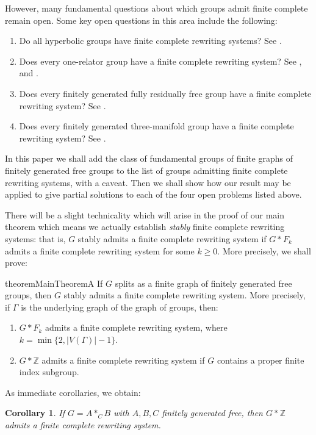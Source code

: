 \documentclass[12pt, a4paper]{amsart}
\newtheorem{corollary}[theorem]{Corollary}
\theoremstyle{definition}
\newcommand{\Z}{\mathbb{Z}}
\begin{document}
However, many fundamental questions about which groups admit finite complete remain open. Some key open questions in this area include the following: 
\begin{enumerate} 
\item
Do all hyperbolic groups have finite complete rewriting systems? See \cite[Problem~2.6]{Diekert2010}.
\item 
Does every one-relator group have a finite complete rewriting system? See \cite{Otto1997}, \cite[Problem 2.9]{Diekert2010} and \cite[Section~1.8.3.]{linton2025theory}.
\item
Does every finitely generated fully residually free group have  a finite complete rewriting system? See 
\cite[Problem~2.7]{Diekert2010}.
\item
Does every finitely generated three-manifold group have a finite complete rewriting system? See \cite{Hermiller1999}.
\end{enumerate}
In this paper we shall add the class of fundamental groups of finite graphs of finitely generated free groups to the list of groups admitting finite complete rewriting systems, with a caveat. Then we shall show how our result may be applied to give partial solutions to each of the four open problems listed above.

There will be a slight technicality which will arise in the proof of our main theorem which means we actually establish \emph{stably} finite complete rewriting systems: that is, $G$ stably admits a finite complete rewriting system if $G*F_k$ admits a finite complete rewriting system for some $k\geqslant 0$. More precisely, we shall prove:


\begin{restatable}{theorem}{MainTheoremA}
\label{thm:main_free}
If $G$ splits as a finite graph of finitely generated free groups, then $G$ stably admits a finite complete rewriting system. More precisely, if $\Gamma$ is the underlying graph of the graph of groups, then:
\begin{enumerate}
\item $G*F_k$ admits a finite complete rewriting system, where $k = \min\{2, |V(\Gamma)| - 1\}$.
\item $G*\Z$ admits a finite complete rewriting system if $G$ contains a proper finite index subgroup.
\end{enumerate} 
\end{restatable}

As immediate corollaries, we obtain:

\begin{corollary}\label{cor:FreeProdAmalg}
If $G = A*_CB$ with $A, B, C$ finitely generated free, then $G*\Z$ admits a finite complete rewriting system.
\end{corollary}
\end{document}

